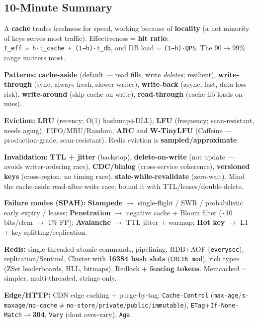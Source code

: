 \documentclass[11pt]{article}
\begin{document}
\subsection{10-Minute Summary}\label{10-minute-summary}

A \textbf{cache} trades freshness for speed, working because of \textbf{locality} (a hot minority of keys serves most traffic). Effectiveness = \textbf{hit ratio}: \texttt{T\_eff\ =\ h·t\_cache\ +\ (1−h)·t\_db}, and DB load = \texttt{(1−h)·QPS}. The 90\(\rightarrow\)99\% range matters most.

\textbf{Patterns:} \textbf{cache-aside} (default --- read fills, write \emph{deletes}; resilient), \textbf{write-through} (sync, always fresh, slower writes), \textbf{write-back} (async, fast, data-loss risk), \textbf{write-around} (skip cache on write), \textbf{read-through} (cache lib loads on miss).

\textbf{Eviction:} \textbf{LRU} (recency; O(1) hashmap+DLL), \textbf{LFU} (frequency; scan-resistant, needs aging), FIFO/MRU/Random, \textbf{ARC} and \textbf{W-TinyLFU} (Caffeine --- production-grade, scan-resistant). Redis eviction is \textbf{sampled/approximate}.

\textbf{Invalidation:} \textbf{TTL + jitter} (backstop), \textbf{delete-on-write} (not update --- avoids writer-ordering race), \textbf{CDC/binlog} (cross-service coherence), \textbf{versioned keys} (cross-region, no timing race), \textbf{stale-while-revalidate} (zero-wait). Mind the cache-aside read-after-write race; bound it with TTL/leases/double-delete.

\textbf{Failure modes (SPAH):} \textbf{Stampede} \(\rightarrow\) single-flight / SWR / probabilistic early expiry / leases; \textbf{Penetration} \(\rightarrow\) negative cache + Bloom filter (\textasciitilde10 bits/elem \(\rightarrow\) 1\% FP); \textbf{Avalanche} \(\rightarrow\) TTL jitter + warmup; \textbf{Hot key} \(\rightarrow\) L1 + key splitting/replication.

\textbf{Redis:} single-threaded atomic commands, pipelining, RDB+AOF (\texttt{everysec}), replication/Sentinel, Cluster with \textbf{16384 hash slots} (\texttt{CRC16\ mod}), rich types (ZSet leaderboards, HLL, bitmaps), Redlock + \textbf{fencing tokens}. Memcached = simpler, multi-threaded, strings-only.

\textbf{Edge/HTTP:} CDN edge caching + purge-by-tag; \texttt{Cache-Control} (\texttt{max-age}/\texttt{s-maxage}/\texttt{no-cache}\(\neq\)\texttt{no-store}/\texttt{private}/\texttt{public}/\texttt{immutable}), \texttt{ETag}+\texttt{If-None-Match}\(\rightarrow\)\textbf{304}, \texttt{Vary} (don\textquotesingle t over-vary), \texttt{Age}.
\end{document}
